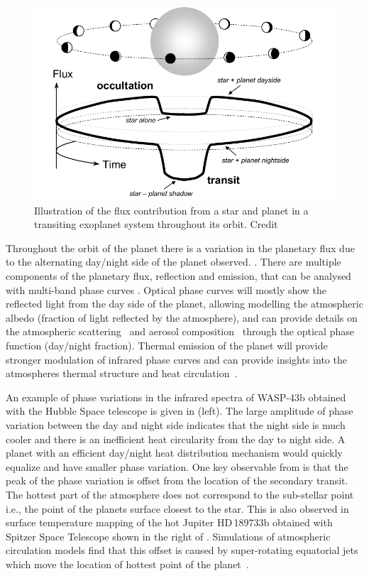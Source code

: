 \begin{figure}
    \centering
    \includegraphics[width=0.6\linewidth]{./figures/introduction/circular_diagram.png}
    \caption{Illustration of the flux contribution from a star and planet in a transiting exoplanet system throughout its orbit. Credit~\citet{winn_transits_2010}}
    \label{fig:transits_and_occultations}
\end{figure}

Throughout the orbit of the planet there is a variation in the planetary flux due to the alternating day/night side of the planet observed. .
There are multiple components of the planetary flux, reflection and emission,  that can be analysed with multi-band phase curves \citep[e.g.][]{knutson_characterizing_2009, esteves_optical_2013}. Optical phase curves will mostly show the reflected light from the day side of the planet, allowing modelling the atmospheric albedo (fraction of light reflected by the atmosphere), and can provide details on the atmospheric scattering~\citep{madhusudhan_analytic_2012} and aerosol composition~\citep{oreshenko_optical_2016} through the optical phase function (day/night fraction). Thermal emission of the planet will provide stronger modulation of infrared phase curves and can provide insights into the atmospheres thermal
structure and heat circulation~\citep{ goodman_thermodynamics_2009, koll_temperature_2016}.


An example of phase variations in the infrared spectra of {WASP-43b} obtained with the Hubble Space telescope is given in  (left). The large amplitude of phase variation between the day and night side indicates that the night side is much cooler and there is an inefficient heat circularity from the day to night side. A planet with an efficient day/night heat distribution mechanism would quickly equalize and have smaller phase variation. One key observable from  is that the peak of the phase variation is offset from the location of the secondary transit. The hottest part of the atmosphere does not correspond to the sub-stellar point i.e., the point of the planets surface closest to the star. This is also observed in surface temperature mapping of the hot Jupiter HD\,189733b obtained with {Spitzer Space Telescope} \citep{knutson_map_2007} shown in the right of . Simulations of atmospheric circulation models find that this offset is caused by super-rotating equatorial jets which move the location of hottest point of the planet~\citep[e.g.][and references therein]{heng_atmospheric_2015}. 

